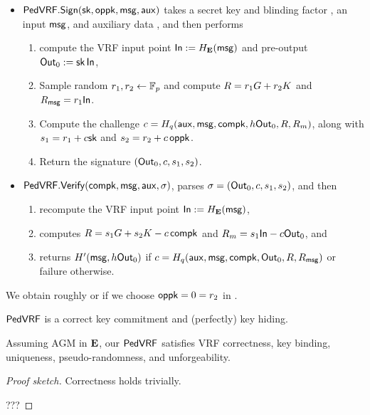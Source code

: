 \begin{itemize}
\item ${\mathsf{PedVRF}}.{\mathsf{Sign}}(\mathsf{sk},\mathsf{oppk},\mathsf{msg},\mathsf{aux})$ takes a secret key \sk and blinding factor \openpk, an input $\mathsf{msg}$, and auxiliary data \aux, and then performs
\begin{enumerate}
    \item compute the VRF input point ${\mathsf{In}} := H_{{\mathbf{E}}}(\mathsf{msg})$ and pre-output ${\mathsf{Out}}_0 := \mathsf{sk} \, {\mathsf{In}}$,
    \item Sample random $r_1,r_2 \leftarrow \mathbb{F}_p$ and compute $R = r_1 G + r_2 K$ and $R_\mathsf{msg} = r_1 {\mathsf{In}}$.
    \item Compute the challenge $c = H_q(\mathsf{aux},\mathsf{msg},\mathsf{compk},h {\mathsf{Out}}_0,R,R_m)$,
     along with $s_1 = r_1 + c \mathsf{sk}$ and $s_2 = r_2 + c \, \mathsf{oppk}$.
    \item Return the signature $({\mathsf{Out}}_0,c,s_1,s_2)$.
\end{enumerate}
\item ${\mathsf{PedVRF}}.{\mathsf{Verify}}(\mathsf{compk},\mathsf{msg},\mathsf{aux},\sigma)$, parses $\sigma = ({\mathsf{Out}}_0,c,s_1,s_2)$, and then 
\begin{enumerate}
    \item recompute the VRF input point ${\mathsf{In}} := H_{{\mathbf{E}}}(\mathsf{msg})$,
    \item computes $R = s_1 G + s_2 K - c \, \mathsf{compk}$ and $R_m = s_1 {\mathsf{In}} - c {\mathsf{Out}}_0$, and
    \item returns $H'(\mathsf{msg}, h {\mathsf{Out}}_0)$ if $c = H_q(\mathsf{aux},\mathsf{msg},\mathsf{compk},{\mathsf{Out}}_0,R,R_\mathsf{msg})$ or failure otherwise.
\end{enumerate}
\end{itemize}

We obtain roughly \cite{nsec5} or \cite{VXEd25519}
if we choose $\mathsf{oppk} = 0 = r_2$ in \Sign.


\begin{lemma}\label{prop:pedersen_vrf_hiding}
${\mathsf{PedVRF}}$ is a correct key commitment and (perfectly) key hiding.
\end{lemma}


\begin{proposition}\label{prop:pedersen_vrf}
Assuming AGM in ${\mathbf{E}}$, %
our ${\mathsf{PedVRF}}$ satisfies VRF correctness, key binding, uniqueness,
pseudo-randomness, and unforgeability. %
\end{proposition}



\begin{proof}[Proof sketch]
Correctness holds trivially.

???
\end{proof}



